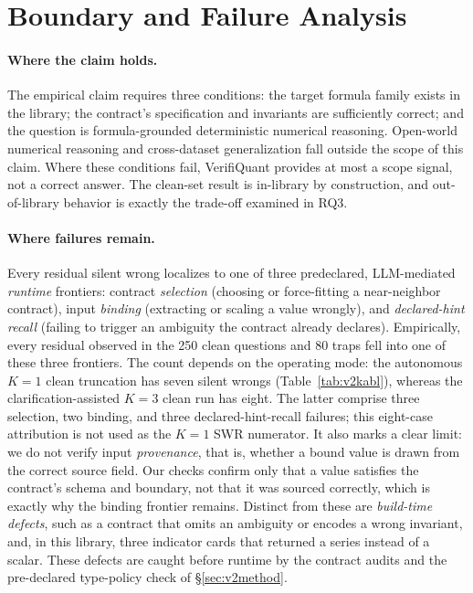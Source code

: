 \documentclass[sigconf,anonymous]{acmart}
\newcommand{\vqAbstainAll}{8}
\newcommand{\vqSelAccAll}{96.7\%}
\newcommand{\vqSWRAll}{3.2\%}
\newcommand{\vqtAbstainAll}{12}
\newcommand{\vqtSWRAll}{1.2\%}
\newcommand{\vqtSelAccAll}{98.7\%}
\begin{document}
\section{Boundary and Failure Analysis}\label{sec:v2boundary}
\paragraph{Where the claim holds.}
The empirical claim requires three conditions: the target formula family exists in the library; the contract's specification and invariants are sufficiently correct; and the question is formula-grounded deterministic numerical reasoning.
Open-world numerical reasoning and cross-dataset generalization fall outside the scope of this claim.
Where these conditions fail, VerifiQuant provides at most a scope signal, not a correct answer.
The clean-set result is in-library by construction, and out-of-library behavior is exactly the trade-off examined in RQ3.

\paragraph{Where failures remain.}
Every residual silent wrong localizes to one of three predeclared, LLM-mediated \emph{runtime} frontiers: contract \emph{selection} (choosing or force-fitting a near-neighbor contract), input \emph{binding} (extracting or scaling a value wrongly), and \emph{declared-hint recall} (failing to trigger an ambiguity the contract already declares).
Empirically, every residual observed in the 250 clean questions and 80 traps fell into one of these three frontiers. The count depends on the operating mode: the autonomous $K{=}1$ clean truncation has seven silent wrongs (Table~\ref{tab:v2kabl}), whereas the clarification-assisted $K{=}3$ clean run has eight. The latter comprise three selection, two binding, and three declared-hint-recall failures; this eight-case attribution is not used as the $K{=}1$ SWR numerator.
It also marks a clear limit: we do not verify input \emph{provenance}, that is, whether a bound value is drawn from the correct source field. Our checks confirm only that a value satisfies the contract's schema and boundary, not that it was sourced correctly, which is exactly why the binding frontier remains.
Distinct from these are \emph{build-time defects}, such as a contract that omits an ambiguity or encodes a wrong invariant, and, in this library, three indicator cards that returned a series instead of a scalar. These defects are caught before runtime by the contract audits and the pre-declared type-policy check of \S\ref{sec:v2method}.
\end{document}
